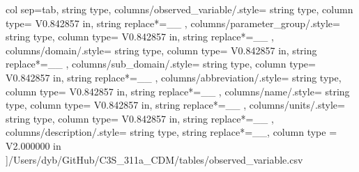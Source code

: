 \begin{landscape}
    col sep=tab,
    string type,
    columns/observed_variable/.style={
            string type, 
            column type= V{0.842857 in}, 
            string replace*={_}{\_}
        },
    columns/parameter_group/.style={
            string type, 
            column type= V{0.842857 in}, 
            string replace*={_}{\_}
        },
    columns/domain/.style={
            string type, 
            column type= V{0.842857 in}, 
            string replace*={_}{\_}
        },
    columns/sub_domain/.style={
            string type, 
            column type= V{0.842857 in}, 
            string replace*={_}{\_}
        },
    columns/abbreviation/.style={
            string type, 
            column type= V{0.842857 in}, 
            string replace*={_}{\_}
        },
    columns/name/.style={
            string type, 
            column type= V{0.842857 in}, 
            string replace*={_}{\_}
        },
    columns/units/.style={
            string type, 
            column type= V{0.842857 in}, 
            string replace*={_}{\_}
        },
    columns/description/.style={
            string type, 
            string replace*={_}{\_},
            column type = V{2.000000 in}
        }
    ]{/Users/dyb/GitHub/C3S_311a_CDM/tables/observed_variable.csv}
\end{landscape}
